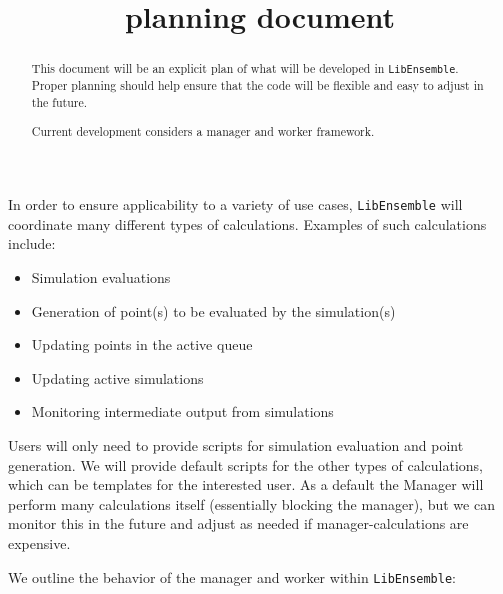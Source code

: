 \documentclass{article}
\title{\libE planning document}
\newcommand{\libE}{\texttt{LibEnsemble}\xspace}
\begin{document}
\maketitle
\begin{abstract}
  This document will be an explicit plan of what will be developed in
  \libE. Proper planning should help ensure that the code will be flexible
  and easy to adjust in the future.

  Current development considers a manager and worker framework. 
\end{abstract}

In order to ensure applicability to a variety of use cases, 
\libE will coordinate many different types of calculations. Examples of
such calculations include:
\begin{itemize}
  \item Simulation evaluations
  \item Generation of point(s) to be evaluated by the simulation(s)
  \item Updating points in the active queue
  \item Updating active simulations
  \item Monitoring intermediate output from simulations
\end{itemize}
Users will only need to provide scripts for simulation evaluation and point
generation. We will provide default scripts for the other types of calculations, 
which can be templates for the interested user. As a default the Manager will
perform many calculations itself (essentially blocking the manager), but we can
monitor this in the future and adjust as needed if manager-calculations are
expensive. 

We outline the behavior of the manager and worker within \libE:
\end{document}

